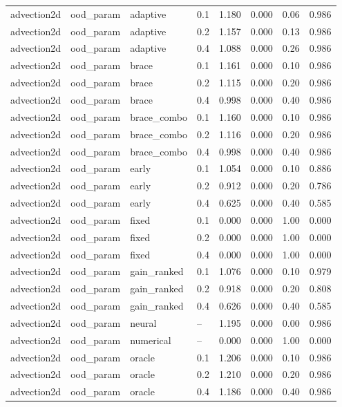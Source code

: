 \begin{longtable}{llllrrrr}
\midrule
advection2d & ood\_param & adaptive & 0.1 & 1.180 & 0.000 & 0.06 & 0.986 \\
advection2d & ood\_param & adaptive & 0.2 & 1.157 & 0.000 & 0.13 & 0.986 \\
advection2d & ood\_param & adaptive & 0.4 & 1.088 & 0.000 & 0.26 & 0.986 \\
advection2d & ood\_param & brace & 0.1 & 1.161 & 0.000 & 0.10 & 0.986 \\
advection2d & ood\_param & brace & 0.2 & 1.115 & 0.000 & 0.20 & 0.986 \\
advection2d & ood\_param & brace & 0.4 & 0.998 & 0.000 & 0.40 & 0.986 \\
advection2d & ood\_param & brace\_combo & 0.1 & 1.160 & 0.000 & 0.10 & 0.986 \\
advection2d & ood\_param & brace\_combo & 0.2 & 1.116 & 0.000 & 0.20 & 0.986 \\
advection2d & ood\_param & brace\_combo & 0.4 & 0.998 & 0.000 & 0.40 & 0.986 \\
advection2d & ood\_param & early & 0.1 & 1.054 & 0.000 & 0.10 & 0.886 \\
advection2d & ood\_param & early & 0.2 & 0.912 & 0.000 & 0.20 & 0.786 \\
advection2d & ood\_param & early & 0.4 & 0.625 & 0.000 & 0.40 & 0.585 \\
advection2d & ood\_param & fixed & 0.1 & 0.000 & 0.000 & 1.00 & 0.000 \\
advection2d & ood\_param & fixed & 0.2 & 0.000 & 0.000 & 1.00 & 0.000 \\
advection2d & ood\_param & fixed & 0.4 & 0.000 & 0.000 & 1.00 & 0.000 \\
advection2d & ood\_param & gain\_ranked & 0.1 & 1.076 & 0.000 & 0.10 & 0.979 \\
advection2d & ood\_param & gain\_ranked & 0.2 & 0.918 & 0.000 & 0.20 & 0.808 \\
advection2d & ood\_param & gain\_ranked & 0.4 & 0.626 & 0.000 & 0.40 & 0.585 \\
advection2d & ood\_param & neural & -- & 1.195 & 0.000 & 0.00 & 0.986 \\
advection2d & ood\_param & numerical & -- & 0.000 & 0.000 & 1.00 & 0.000 \\
advection2d & ood\_param & oracle & 0.1 & 1.206 & 0.000 & 0.10 & 0.986 \\
advection2d & ood\_param & oracle & 0.2 & 1.210 & 0.000 & 0.20 & 0.986 \\
advection2d & ood\_param & oracle & 0.4 & 1.186 & 0.000 & 0.40 & 0.986 \\

\end{longtable}
